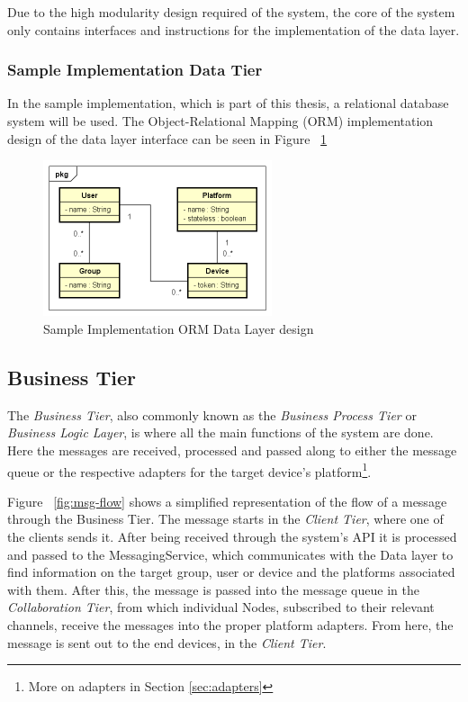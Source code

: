 Due to the high modularity design required of the system, the core of the system only contains interfaces and instructions for the implementation of the data layer.

\subsubsection{Sample Implementation Data Tier}
In the sample implementation, which is part of this thesis, a relational database system will be used. The Object-Relational Mapping (ORM) implementation design of the data layer interface can be seen in Figure ~\ref{fig:orm}

\begin{figure}[H]
	\centering
	\includegraphics[width=0.6\textwidth]{figures/03_design/orm}
    \caption{Sample Implementation ORM Data Layer design}
    \label{fig:orm}
\end{figure}

\subsection{Business Tier} \label{design:business-tier}
The \textit{Business Tier}, also commonly known as the \textit{Business Process Tier} or \textit{Business Logic Layer}, is where all the main functions of the system are done. Here the messages are received, processed and passed along to either the message queue or the respective adapters for the target device's platform\footnote{More on adapters in Section \ref{sec:adapters}}.

Figure ~\ref{fig:msg-flow} shows a simplified representation of the flow of a message through the Business Tier. The message starts in the \textit{Client Tier}, where one of the clients sends it. After being received through the system's API it is processed and passed to the MessagingService, which communicates with the Data layer to find information on the target group, user or device and the platforms associated with them. After this, the message is passed into the message queue in the \textit{Collaboration Tier}, from which individual Nodes, subscribed to their relevant channels, receive the messages into the proper platform adapters. From here, the message is sent out to the end devices, in the \textit{Client Tier}.

